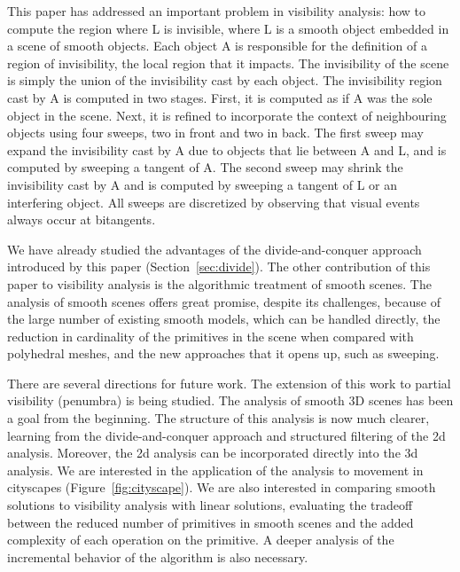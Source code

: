 \documentclass[9pt,twocolumn]{article}
\begin{document}
This paper has addressed an important problem in visibility analysis:
how to compute the region where L is invisible,
where L is a smooth object embedded in a scene of smooth objects.
Each object A is responsible for the definition of a region of invisibility,
the local region that it impacts.
The invisibility of the scene is simply the union of the invisibility cast by each object.
The invisibility region cast by A is computed in two stages.
First, it is computed as if A was the sole object in the scene.
Next, it is refined to incorporate the context of neighbouring
objects using four sweeps, two in front and two in back.
The first sweep may expand the invisibility cast by A due to objects that
lie between A and L, and is computed by sweeping a tangent of A.
The second sweep may shrink the invisibility cast by A and is computed by
sweeping a tangent of L or an interfering object.
All sweeps are discretized by observing that visual events always occur at bitangents.


We have already studied the advantages of the divide-and-conquer approach
introduced by this paper (Section~\ref{sec:divide}).
The other contribution of this paper to visibility analysis is the
algorithmic treatment of smooth scenes.
The analysis of smooth scenes offers great promise, despite its challenges,
because of the large number of existing smooth models, which can be handled directly,
the reduction in cardinality of the primitives in the scene
when compared with polyhedral meshes,
and the new approaches that it opens up, such as sweeping.

There are several directions for future work.
The extension of this work to partial visibility (penumbra) is being studied.
The analysis of smooth 3D scenes has been a goal from the beginning.
The structure of this analysis is now much clearer, learning from the divide-and-conquer
approach and structured filtering of the 2d analysis.
Moreover, the 2d analysis can be incorporated directly into the 3d analysis.
We are interested in the application of the analysis to movement in cityscapes
(Figure~\ref{fig:cityscape}).
%
%
We are also interested in comparing smooth solutions to visibility analysis with 
linear solutions,
evaluating the tradeoff between the reduced number
of primitives in smooth scenes and the added complexity of each operation on
the primitive.
A deeper analysis of the incremental behavior of the algorithm is also necessary.
\end{document}
